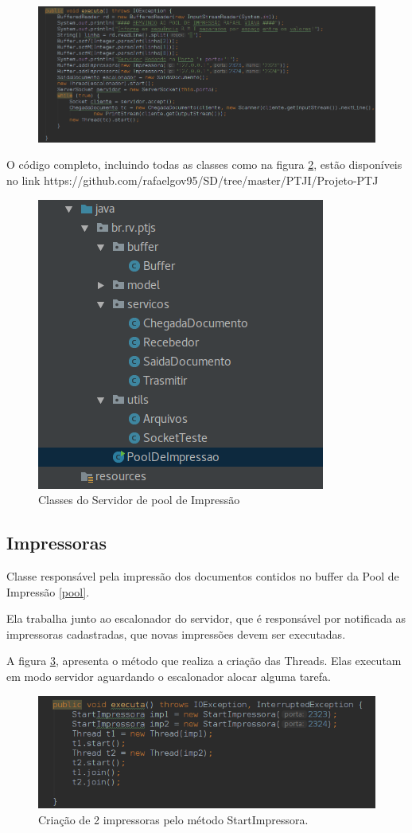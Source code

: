 \documentclass[12pt]{article}
\begin{document}
\begin{figure}[H]
	\centering
	\includegraphics[width=0.7\linewidth]{imagens/screenshot006}
	\caption{}
	\label{fig:screenshot006}
\end{figure}
O código completo, incluindo todas as classes como na figura \ref{fig:screenshot008}, estão disponíveis no link https://github.com/rafaelgov95/SD/tree/master/PTJI/Projeto-PTJ
\begin{figure}[H]
	\centering
	\includegraphics[width=0.4\linewidth]{imagens/screenshot008}
	\caption{Classes do Servidor de pool de Impressão}
	\label{fig:screenshot008}
\end{figure}


\subsection{Impressoras}
	Classe responsável pela impressão dos documentos contidos  no buffer da Pool de Impressão \ref{pool}.
	
	Ela trabalha junto ao escalonador do servidor, que é responsável por notificada as impressoras cadastradas, que novas impressões devem ser executadas.
	
	A figura \ref{fig:screenshot002}, apresenta o método que realiza a criação das Threads.
	Elas executam em modo servidor aguardando o escalonador alocar alguma tarefa.
\begin{figure}[H]
	\centering
	\includegraphics[width=0.7\linewidth]{imagens/screenshot002}
	\caption{Criação de 2 impressoras pelo método StartImpressora.}
	\label{fig:screenshot002}
\end{figure}
\end{document}
